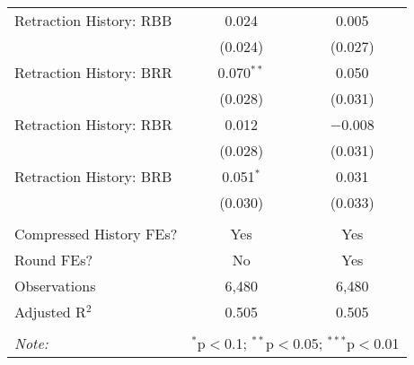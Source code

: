 \begin{table}[!htbp]
\begin{tabular}{@{\extracolsep{5pt}}lcc}
  Retraction History: RBB & 0.024 & 0.005 \\ 
  & (0.024) & (0.027) \\ 
  Retraction History: BRR & 0.070$^{**}$ & 0.050 \\ 
  & (0.028) & (0.031) \\ 
  Retraction History: RBR & 0.012 & $-$0.008 \\ 
  & (0.028) & (0.031) \\ 
  Retraction History: BRB & 0.051$^{*}$ & 0.031 \\ 
  & (0.030) & (0.033) \\ 
 \hline \\[-1.8ex] 
Compressed History FEs? & Yes & Yes \\ 
Round FEs? & No & Yes \\ 
Observations & 6,480 & 6,480 \\ 
Adjusted R$^{2}$ & 0.505 & 0.505 \\ 
\hline 
\hline \\[-1.8ex] 
\textit{Note:}  & \multicolumn{2}{r}{$^{*}$p$<$0.1; $^{**}$p$<$0.05; $^{***}$p$<$0.01} \\ 
\end{tabular} 
\end{table} 
